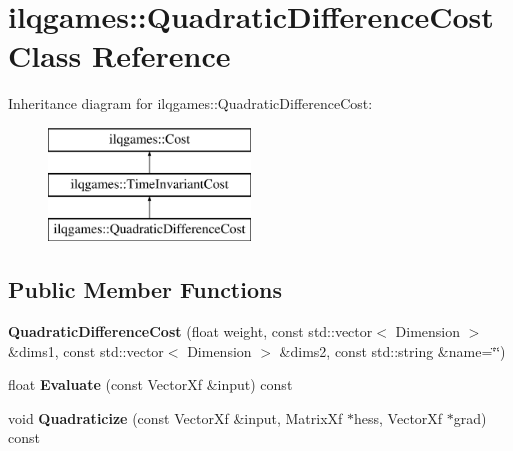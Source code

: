 \hypertarget{classilqgames_1_1_quadratic_difference_cost}{}\section{ilqgames\+:\+:Quadratic\+Difference\+Cost Class Reference}
\label{classilqgames_1_1_quadratic_difference_cost}
Inheritance diagram for ilqgames\+:\+:Quadratic\+Difference\+Cost\+:\begin{figure}[H]
\begin{center}
\leavevmode
\includegraphics[height=3.000000cm]{classilqgames_1_1_quadratic_difference_cost}
\end{center}
\end{figure}
\subsection*{Public Member Functions}
\begin{DoxyCompactItemize}
\item 
{\bfseries Quadratic\+Difference\+Cost} (float weight, const std\+::vector$<$ Dimension $>$ \&dims1, const std\+::vector$<$ Dimension $>$ \&dims2, const std\+::string \&name=\char`\"{}\char`\"{})\hypertarget{classilqgames_1_1_quadratic_difference_cost_afe5dfe4c10ff8fd995f9f0313860883e}{}\label{classilqgames_1_1_quadratic_difference_cost_afe5dfe4c10ff8fd995f9f0313860883e}

\item 
float {\bfseries Evaluate} (const Vector\+Xf \&input) const \hypertarget{classilqgames_1_1_quadratic_difference_cost_adc6943c8b7dee651b61406e1276ecbca}{}\label{classilqgames_1_1_quadratic_difference_cost_adc6943c8b7dee651b61406e1276ecbca}

\item 
void {\bfseries Quadraticize} (const Vector\+Xf \&input, Matrix\+Xf $\ast$hess, Vector\+Xf $\ast$grad) const \hypertarget{classilqgames_1_1_quadratic_difference_cost_a10d67623d9b82bf350a7ff98bda102e2}{}\label{classilqgames_1_1_quadratic_difference_cost_a10d67623d9b82bf350a7ff98bda102e2}

\end{DoxyCompactItemize}
